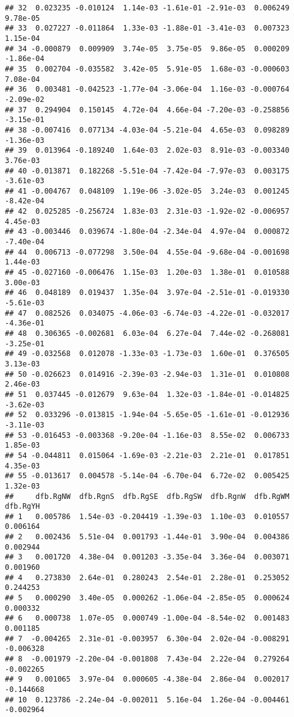 \documentclass[
]{article}
\begin{document}
\begin{verbatim}
## 32  0.023235 -0.010124  1.14e-03 -1.61e-01 -2.91e-03  0.006249  9.78e-05
## 33  0.027227 -0.011864  1.33e-03 -1.88e-01 -3.41e-03  0.007323  1.15e-04
## 34 -0.000879  0.009909  3.74e-05  3.75e-05  9.86e-05  0.000209 -1.86e-04
## 35  0.002704 -0.035582  3.42e-05  5.91e-05  1.68e-03 -0.000603  7.08e-04
## 36  0.003481 -0.042523 -1.77e-04 -3.06e-04  1.16e-03 -0.000764 -2.09e-02
## 37  0.294904  0.150145  4.72e-04  4.66e-04 -7.20e-03 -0.258856 -3.15e-01
## 38 -0.007416  0.077134 -4.03e-04 -5.21e-04  4.65e-03  0.098289 -1.36e-03
## 39  0.013964 -0.189240  1.64e-03  2.02e-03  8.91e-03 -0.003340  3.76e-03
## 40 -0.013871  0.182268 -5.51e-04 -7.42e-04 -7.97e-03  0.003175 -3.61e-03
## 41 -0.004767  0.048109  1.19e-06 -3.02e-05  3.24e-03  0.001245 -8.42e-04
## 42  0.025285 -0.256724  1.83e-03  2.31e-03 -1.92e-02 -0.006957  4.45e-03
## 43 -0.003446  0.039674 -1.80e-04 -2.34e-04  4.97e-04  0.000872 -7.40e-04
## 44  0.006713 -0.077298  3.50e-04  4.55e-04 -9.68e-04 -0.001698  1.44e-03
## 45 -0.027160 -0.006476  1.15e-03  1.20e-03  1.38e-01  0.010588  3.00e-03
## 46  0.048189  0.019437  1.35e-04  3.97e-04 -2.51e-01 -0.019330 -5.61e-03
## 47  0.082526  0.034075 -4.06e-03 -6.74e-03 -4.22e-01 -0.032017 -4.36e-01
## 48  0.306365 -0.002681  6.03e-04  6.27e-04  7.44e-02 -0.268081 -3.25e-01
## 49 -0.032568  0.012078 -1.33e-03 -1.73e-03  1.60e-01  0.376505  3.13e-03
## 50 -0.026623  0.014916 -2.39e-03 -2.94e-03  1.31e-01  0.010808  2.46e-03
## 51  0.037445 -0.012679  9.63e-04  1.32e-03 -1.84e-01 -0.014825 -3.62e-03
## 52  0.033296 -0.013815 -1.94e-04 -5.65e-05 -1.61e-01 -0.012936 -3.11e-03
## 53 -0.016453 -0.003368 -9.20e-04 -1.16e-03  8.55e-02  0.006733  1.85e-03
## 54 -0.044811  0.015064 -1.69e-03 -2.21e-03  2.21e-01  0.017851  4.35e-03
## 55 -0.013617  0.004578 -5.14e-04 -6.70e-04  6.72e-02  0.005425  1.32e-03
##     dfb.RgNW  dfb.RgnS  dfb.RgSE  dfb.RgSW  dfb.RgnW  dfb.RgWM  dfb.RgYH
## 1   0.005786  1.54e-03 -0.204419 -1.39e-03  1.10e-03  0.010557  0.006164
## 2   0.002436  5.51e-04  0.001793 -1.44e-01  3.90e-04  0.004386  0.002944
## 3   0.001720  4.38e-04  0.001203 -3.35e-04  3.36e-04  0.003071  0.001960
## 4   0.273830  2.64e-01  0.280243  2.54e-01  2.28e-01  0.253052  0.244253
## 5   0.000290  3.40e-05  0.000262 -1.06e-04 -2.85e-05  0.000624  0.000332
## 6   0.000738  1.07e-05  0.000749 -1.00e-04 -8.54e-02  0.001483  0.001185
## 7  -0.004265  2.31e-01 -0.003957  6.30e-04  2.02e-04 -0.008291 -0.006328
## 8  -0.001979 -2.20e-04 -0.001808  7.43e-04  2.22e-04  0.279264 -0.002265
## 9   0.001065  3.97e-04  0.000605 -4.38e-04  2.86e-04  0.002017 -0.144668
## 10  0.123786 -2.24e-04 -0.002011  5.16e-04  1.26e-04 -0.004461 -0.002964

\end{verbatim}
\end{document}
